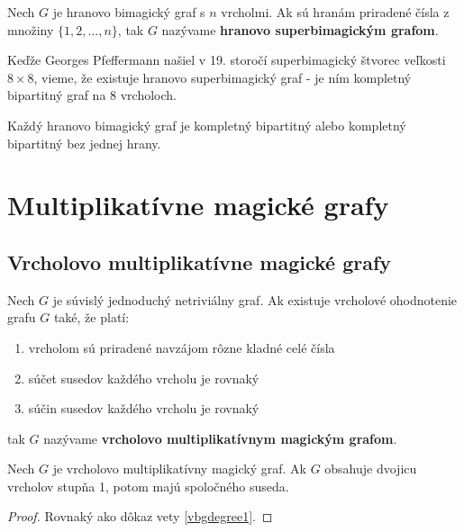 \begin{definition} Nech $G$ je hranovo bimagický graf s $n$ vrcholmi. Ak sú hranám priradené čísla z množiny $\{1, 2, \dots , n\}$, tak $G$ nazývame \textbf{hranovo superbimagickým grafom}.
\end{definition} 

Keďže Georges Pfeffermann našiel v 19. storočí superbimagický štvorec veľkosti $8 \times 8$, vieme, že existuje hranovo superbimagický graf - je ním kompletný bipartitný graf na $8$ vrcholoch.

\begin{hypothesis} Každý hranovo bimagický graf je kompletný bipartitný alebo kompletný bipartitný bez jednej hrany.
\end{hypothesis} 



\section{Multiplikatívne magické grafy}

\subsection{Vrcholovo multiplikatívne magické grafy}

\begin{definition} Nech $G$ je súvislý jednoduchý netriviálny graf. Ak existuje vrcholové ohodnotenie grafu $G$ také, že platí:

\begin{enumerate}
\item vrcholom sú priradené navzájom rôzne kladné celé čísla
\item súčet susedov každého vrcholu je rovnaký
\item súčin susedov každého vrcholu je rovnaký
\end{enumerate}

tak $G$ nazývame \textbf{vrcholovo multiplikatívnym magickým grafom}.
\end{definition} 

\begin{theorem}
\label{vmmgdegree1}
Nech $G$ je vrcholovo multiplikatívny magický graf. Ak $G$ obsahuje dvojicu vrcholov stupňa 1, potom majú spoločného suseda.
\end{theorem}

\begin{proof} Rovnaký ako dôkaz vety \ref{vbgdegree1}.
\end{proof}


